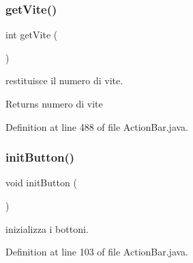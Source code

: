 \subsubsection{\texorpdfstring{get\+Vite()}{getVite()}}
{\footnotesize\ttfamily int get\+Vite (\begin{DoxyParamCaption}{ }\end{DoxyParamCaption})}



restituisce il numero di vite. 

\begin{DoxyReturn}{Returns}
numero di vite 
\end{DoxyReturn}


Definition at line 488 of file Action\+Bar.\+java.

\mbox{\label{classui_1_1_action_bar_aed9fe7e919d4355a7ad86701d44e1fea}} 
\subsubsection{\texorpdfstring{init\+Button()}{initButton()}}
{\footnotesize\ttfamily void init\+Button (\begin{DoxyParamCaption}{ }\end{DoxyParamCaption})\hspace{0.3cm}{\ttfamily [private]}}



inizializza i bottoni. 



Definition at line 103 of file Action\+Bar.\+java.

